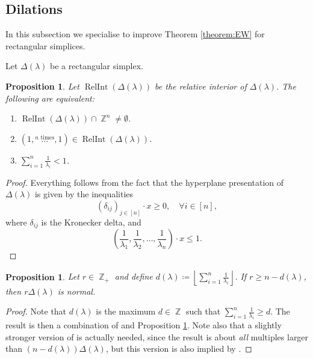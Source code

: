 \documentclass[a4paper,11pt]{amsart}
\theoremstyle{plain}
\newtheorem{proposition}[theorem]{Proposition}
\theoremstyle{definition}
\theoremstyle{remark}
\DeclareMathOperator{\ZZ}{\mathbb{Z}}
\DeclareMathOperator{\RelInt}{RelInt}
\begin{document}
\subsection{Dilations} \hfill

In this subsection we specialise \cite[Theorem 1.1, Corollary 1.4]{HerinSchenckSmith:2006} to improve Theorem \ref{theorem:EW} for rectangular simplices.

Let $\Delta(\lambda)$ be a rectangular simplex.

\begin{proposition}\label{proposition:lattice-point-relative-interior}
    Let $\RelInt(\Delta(\lambda))$ be the relative interior of $\Delta(\lambda)$. The following are equivalent:
    \begin{enumerate}[1.]
        \item $\RelInt(\Delta(\lambda)) \cap \ZZ^n \neq \emptyset$.
        \item $(1, \stackrel{n \text{ times}}{\ldots}, 1) \in \RelInt(\Delta(\lambda))$.
        \item $\sum_{i = 1}^n \frac{1}{\lambda_i} < 1$.
    \end{enumerate}
\end{proposition}

\begin{proof}
    Everything follows from the fact that the hyperplane presentation of $\Delta(\lambda)$ is given by the inequalities
    \[
    (\delta_{ij})_{j \in [n]} \cdot x \geq 0, \quad \forall i \in [n],
    \]
    where $\delta_{ij}$ is the Kronecker delta, and
    \[
    \left ( \frac{1}{\lambda_1}, \frac{1}{\lambda_2}, \ldots, \frac{1}{\lambda_n} \right ) \cdot x \leq 1.
    \]
\end{proof}

\begin{proposition}\label{proposition:milena-bound}
    Let $r \in \ZZ_+$ and define $d(\lambda) \coloneqq \left \lfloor \sum_{i = 1}^n \frac{1}{\lambda_i} \right \rfloor$. If $r \geq n - d(\lambda)$, then $r\Delta(\lambda)$ is normal.
\end{proposition}

\begin{proof}
    Note that $d(\lambda)$ is the maximum $d \in \ZZ$ such that $\sum_{i = 1}^n \frac{1}{\lambda_i} \geq d$. The result is then a combination of \cite[Corollary 1.4]{HerinSchenckSmith:2006} and Proposition \ref{proposition:lattice-point-relative-interior}. Note also that a slightly stronger version of \cite[Corollary 1.4]{HerinSchenckSmith:2006} is actually needed, since the result is about \emph{all} multiples larger than $(n - d(\lambda))\Delta(\lambda)$, but this version is also implied by \cite[Theorem 1.1]{HerinSchenckSmith:2006}.
\end{proof}
\end{document}

